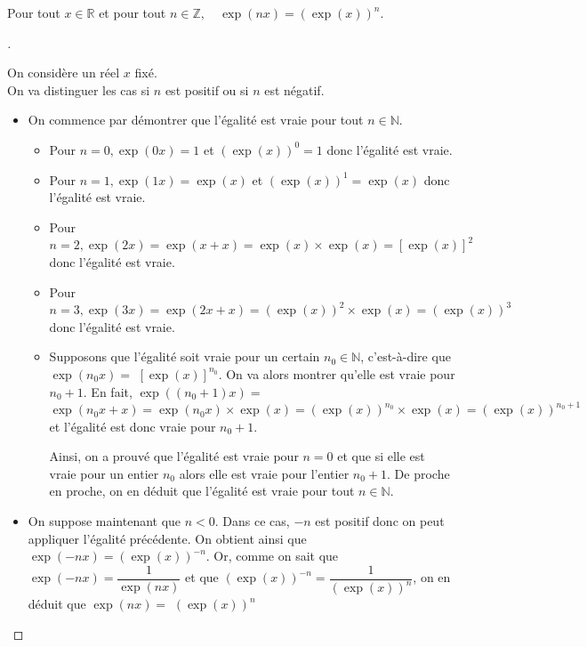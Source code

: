 \documentclass[12pt]{article}
\theoremstyle{break}
\newenvironment{demo}[1][\proofname]{%
  \begin{proof}[#1]$ $\newline
  }{%
  \end{proof}
}
\begin{document}
\begin{proposition}{}{}
  Pour tout $x \in \mathbb{R}$ et pour tout $n \in \mathbb{Z}, \quad \exp (n x)=(\exp (x))^{n}$.
\end{proposition}

\begin{demo}
  On considère un réel $x$ fixé.\\
  On va distinguer les cas si $n$ est positif ou si $n$ est négatif.

  \begin{itemize}
    \item On commence par démontrer que l'égalité est vraie pour tout $n \in \mathbb{N}$.
      \begin{itemize}
        \item Pour $n=0, \exp (0 x)=1$ et $(\exp (x))^{0}=1$ donc l'égalité est vraie.
        \item Pour $n=1, \exp (1 x)=\exp (x)$ et $(\exp (x))^{1}=\exp (x)$ donc l'égalité est vraie.
        \item Pour $n=2, \exp (2 x)=\exp (x+x)=\exp (x) \times \exp (x)=[\exp (x)]^{2}$ donc l'égalité est vraie.
        \item Pour $n=3, \exp (3 x)=\exp (2 x+x)=(\exp (x))^{2} \times \exp (x)=(\exp (x))^{3} \quad$ donc l'égalité est vraie.
    \item Supposons que l'égalité soit vraie pour un certain $n_{0} \in \mathbb{N}$, c'est-à-dire que $\exp \left(n_{0} x\right)=$ $[\exp (x)]^{n_{0}}$. On va alors montrer qu'elle est vraie pour $n_{0}+1$. En fait, $\exp \left(\left(n_{0}+1\right) x\right)=$ $\exp \left(n_{0} x+x\right)=\exp \left(n_{0} x\right) \times \exp (x)=(\exp (x))^{n_{0}} \times \exp (x)=(\exp (x))^{n_{0}+1}$ et l'égalité est donc vraie pour $n_{0}+1$.
  
  Ainsi, on a prouvé que l'égalité est vraie pour $n=0$ et que si elle est vraie pour un entier $n_{0}$ alors elle est vraie pour l'entier $n_{0}+1$. De proche en proche, on en déduit que l'égalité est vraie pour tout $n \in \mathbb{N}$.
  \end{itemize}

  \item On suppose maintenant que $n<0$. Dans ce cas, $-n$ est positif donc on peut appliquer l'égalité précédente. On obtient ainsi que $\exp (-n x)=(\exp (x))^{-n}$. Or, comme on sait que $\exp (-n x)=\dfrac{1}{\exp (n x)}$ et que $(\exp (x))^{-n}=\dfrac{1}{(\exp (x))^{n}}$, on en déduit que $\exp (n x)=$ $(\exp (x))^{n}$
\end{itemize}
\end{demo}
\end{document}
